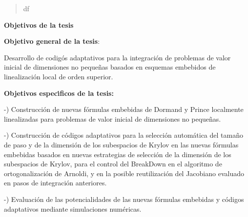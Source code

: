 \begin{abstract}
	df
\end{abstract}
\newpage

\begin{center}
	{\large \textbf{Objetivos de la tesis}}
\end{center}
\qquad 

\qquad \textbf{Objetivo general de la tesis}: 

\qquad 

\qquad Desarrollo de codig\'{o}s adaptativos para la integraci\'{o}n de
problemas de valor inicial de dimensiones no peque\~{n}as basados en
esquemas embebidos de linealización local de orden superior. 

\qquad 

\qquad \textbf{Objetivos espec\'{\i}ficos de la tesis:}

\qquad 

-) Construcción de nuevas f\'{o}rmulas embebidas de Dormand y Prince
localmente linealizadas para problemas de valor inicial de dimensiones no
peque\~{n}as.

\qquad 

-) Construcción de c\'{o}digos adaptativos para la selecci\'{o}n
autom\'{a}tica del tama\~{n}o de paso y de la dimensión de los subespacios
de Krylov en las nuevas f\'{o}rmulas embebidas basados en nuevas estrategias
de selecci\'{o}n de la dimensión de los subespacios de Krylov, para el
control del BreakDown en el algoritmo de ortogonalizaci\'{o}n de Arnoldi, y
en la posible reutilizaci\'{o}n del Jacobiano evaluado en pasos de integraci\'{o}n anteriores.

\qquad 

-) Evaluación de las potencialidades de las nuevas fórmulas embebidas y códigos adaptativos mediante simulaciones numéricas.

\qquad 